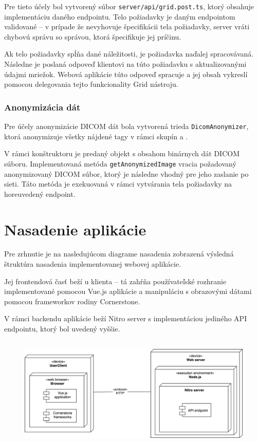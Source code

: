 Pre tieto účely bol vytvorený súbor \texttt{server/api/grid.post.ts}, ktorý obsahuje implementáciu daného endpointu. Telo požiadavky je daným endpointom validované --  v prípade že nevyhovuje špecifikácii tela požiadavky, server vráti chybovú správu so správou, ktorá špecifikuje jej príčinu.

Ak telo požiadavky spĺňa dané náležitosti, je požiadavka naďalej spracovávaná. Následne je poslaná odpoveď klientovi na túto požiadavku s aktualizovanými údajmi mriežok. Webová aplikácie túto odpoveď spracuje a jej obsah vykreslí pomocou delegovania tejto funkcionality Grid nástroju.

\subsubsection {Anonymizácia dát}
Pre účely anonymizácie DICOM dát bola vytvorená trieda \texttt{DicomAnonymizer}, ktorá anonymizuje všetky nájdené tagy v rámci skupín  a .

\clearpage

V rámci konštruktoru je predaný objekt s obsahom binárnych dát DICOM súboru. Implementovaná metóda \texttt{getAnonymizedImage} vracia požadovaný anonymizovaný DICOM súbor, ktorý je následne vhodný pre jeho zaslanie po sieti. Táto metóda je exekuovaná v rámci vytvárania tela požiadavky na horeuvedený endpoint.

\section {Nasadenie aplikácie}
Pre zrhnutie je na nasledujúcom diagrame nasadenia zobrazená výsledná štruktúra nasadenia implementovanej webovej aplikácie.

Jej frontendová časť beží u klienta -- tá zahŕňa používateľské rozhranie implementované pomocou Vue.js aplikácie a manipuláciu s obrazovými dátami pomocou frameworkov rodiny Cornerstone.

V rámci backendu aplikácie beží Nitro server s implementáciou jediného API endpointu, ktorý bol uvedený vyššie.

\begin {figure}[H]
        \centering
        \includegraphics[height=5.4cm]{media/graphs/deployment_diagram.png}
        \captionsetup{justification=centering}
\end {figure}

